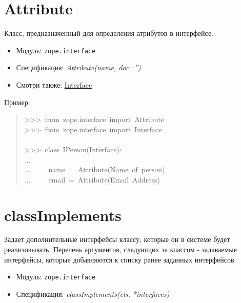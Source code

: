 \documentclass[a4paper,openany,twoside,final]{book}
\providecommand*{\DUroletitlereference}[1]{\textsl{#1}}
\begin{document}
\section*{Attribute%
  \label{attribute}%
}

Класс, предназначенный для определения атрибутов в интерфейсе.

\begin{itemize}

\item Модуль: \texttt{zope.interface}

\item Спецификация: \DUroletitlereference{Attribute(name, doc='')}

\item Смотри также: \hyperref[interface]{Interface}

\end{itemize}

Пример:

\begin{quote}{\ttfamily \raggedright \noindent
>{}>{}>~from~zope.interface~import~Attribute\\
>{}>{}>~from~zope.interface~import~Interface\\
~\\
>{}>{}>~class~IPerson(Interface):\\
...\\
...~~~~~name~=~Attribute(\textquotedbl{}Name~of~person\textquotedbl{})\\
...~~~~~email~=~Attribute(\textquotedbl{}Email~Address\textquotedbl{})
}
\end{quote}


\section*{classImplements%
  \label{classimplements}%
}

Задает дополнительные интерфейсы классу, которые он в системе будет
реализовывать.  Перечень аргументов, следующих за классом -
задаваемые интерфейсы, которые добавляются к списку ранее
заданных интерфейсов.

\begin{itemize}

\item Модуль: \texttt{zope.interface}

\item Спецификация: \DUroletitlereference{classImplements(cls, *interfaces)}

\end{itemize}
\end{document}
